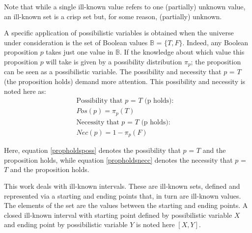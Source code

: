 
Note that while a single ill-known value refers to one (partially) unknown value, an ill-known set is a crisp set but, for some reason, (partially) unknown.

A specific application of possibilistic variables is obtained when the universe under consideration is the set of Boolean values $\mathbb{B}$ = $\{T,F\}$. Indeed, any Boolean proposition $p$ takes just one value in $\mathbb{B}$. If the knowledge about which value this proposition $p$ will take is given by a possibility distribution $\pi_p$; the proposition can be seen as a possibilistic variable. The possibility and necessity that $p$ = $T$ (the proposition holds) demand more attention. This possibility and necessity is noted here as:
\begin{align}
\label{propholdsposs}
\text{Possibility that $p$ = $T$ (p holds):} &\\
\nonumber
Pos(p) = \pi_p(T)  \\
\label{propholdsnecc}
\text{Necessity that $p$ = $T$ (p holds):} & \\
\nonumber
Nec(p) = 1-\pi_p(F) 
\end{align}

Here, equation \eqref{propholdsposs} denotes the possibility that $p$ = $T$ and the proposition holds, while equation \eqref{propholdsnecc} denotes the necessity that $p$ = $T$ and the proposition holds.

This work deals with ill-known intervals. These are ill-known sets, defined and represented via a starting and ending points that, in turn are ill-known values. The elements of the set are the values between the starting and ending points. A closed ill-known interval with starting point defined by possibilistic variable $X$ and ending point by possibilistic variable $Y$ is noted here $\left[X, Y\right]$. %

